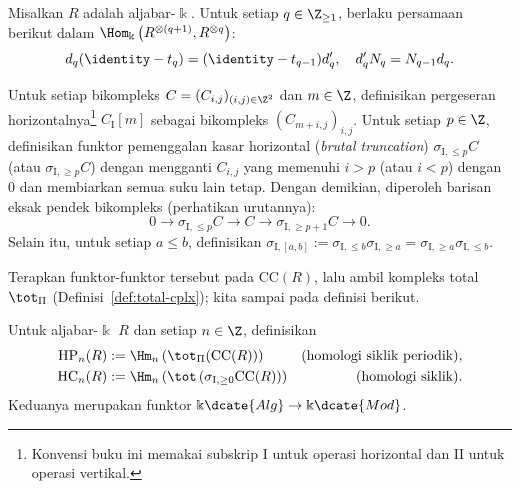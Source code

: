 \begin{lema}\label{prop:CC-cplx}
	Misalkan $R$ adalah aljabar-$\Bbbk$. Untuk setiap
	$q\in\Z_{\geq1}$, berlaku persamaan berikut dalam
	$\Hom_{\Bbbk}\left(R^{\otimes(q+1)},R^{\otimes q}\right)$:
	\[ d_q(\identity-t_q)=(\identity-t_{q-1})d'_q,
		\quad d'_qN_q=N_{q-1}d_q. \]
\end{lema}

Untuk setiap bikompleks $C=(C_{i,j})_{(i,j)\in\Z^2}$ dan $m\in\Z$,
definisikan pergeseran horizontalnya\footnote{Konvensi buku ini memakai
subskrip $\mathrm{I}$ untuk operasi horizontal dan $\mathrm{II}$ untuk
operasi vertikal.} $C_{\mathrm{I}}[m]$ sebagai bikompleks
$(C_{m+i,j})_{i,j}$. Untuk setiap $p\in\Z$, definisikan funktor pemenggalan
kasar horizontal (\textit{brutal truncation})
$\sigma_{\mathrm{I},\leq p}C$ (atau
$\sigma_{\mathrm{I},\geq p}C$) dengan mengganti $C_{i,j}$ yang memenuhi
$i>p$ (atau $i<p$) dengan $0$ dan membiarkan semua suku lain tetap.
Dengan demikian, diperoleh barisan eksak pendek bikompleks
(perhatikan urutannya):
\begin{equation}\label{eqn:homology-I-brute-truncation}
	0 \to \sigma_{\mathrm{I}, \leq p} C \to C
	\to \sigma_{\mathrm{I}, \geq p+1} C \to 0.
\end{equation}
Selain itu, untuk setiap $a\leq b$, definisikan
$\sigma_{\mathrm{I},[a,b]}:=
\sigma_{\mathrm{I},\leq b}\sigma_{\mathrm{I},\geq a}
=\sigma_{\mathrm{I},\geq a}\sigma_{\mathrm{I},\leq b}$.


Terapkan funktor-funktor tersebut pada $\mathrm{CC}(R)$, lalu ambil kompleks
total $\tot_{\Pi}$ (Definisi~\ref{def:total-cplx}); kita sampai pada definisi
berikut.

\begin{definisi}\label{def:HC}
	Untuk aljabar-$\Bbbk$ $R$ dan setiap $n\in\Z$, definisikan
	\begin{align*}
		\mathrm{HP}_n(R)
		&:=\Hm_n\left(\tot_{\Pi}(\mathrm{CC}(R))\right)
		&\text{(homologi siklik periodik)},\\
		\mathrm{HC}_n(R)
		&:=\Hm_n\left(
		\tot\left(\sigma_{\mathrm{I},\geq0}\mathrm{CC}(R)\right)\right)
		&\text{(homologi siklik)}.
	\end{align*}
	Keduanya merupakan funktor
	$\Bbbk\dcate{Alg}\to\Bbbk\dcate{Mod}$.
\end{definisi}

